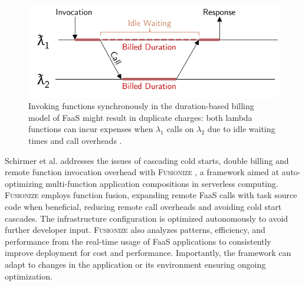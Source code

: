\begin{figure}
    \centering
    \includegraphics[width=\linewidth]{figures/doublespending}
    \caption{
        Invoking functions synchronously in the duration-based billing model of
        FaaS might result in duplicate charges: both lambda functions can incur
        expenses when ${\lambda}_{1}$ calls on ${\lambda}_{2}$ due to idle
        waiting times and call overheads \cite{schirmer2023fusionize}.
    }
    \label{fig:doublespending}
\end{figure}


Schirmer et al. addresses the issues of cascading cold starts, double billing
and remote function invocation overhead with \textsc{Fusionize}
\cite{schirmer2023fusionize}, a framework aimed at auto-optimizing
multi-function application compositions in serverless computing.
\textsc{Fusionize} employs function fusion, expanding remote FaaS calls with
task source code when beneficial, reducing remote call overheads and avoiding
cold start cascades. The infrastructure configuration is optimized autonomously
to avoid further developer input. \textsc{Fusionize} also analyzes patterns,
efficiency, and performance from the real-time usage of FaaS applications to
consistently improve deployment for cost and performance. Importantly, the
framework can adapt to changes in the application or its environment ensuring
ongoing optimization.

